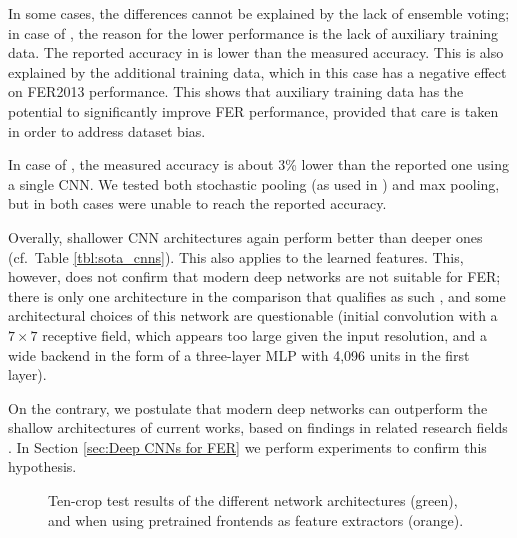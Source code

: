 \documentclass[conference,10pt,a4paper]{IEEEtran}
\begin{document}
In some cases, the differences cannot be explained by the lack of ensemble voting; in case of \cite{zhang2015}, the reason for the lower performance is the lack of auxiliary training data. The reported accuracy in \cite{mollahosseini15} is lower than the measured accuracy. This is also explained by the additional training data, which in this case has a negative effect on FER2013 performance. This shows that auxiliary training data has the potential to significantly improve FER performance, provided that care is taken in order to address dataset bias.

In case of \cite{yu15}, the measured accuracy is about 3\% lower than the reported one using a single CNN. We tested both stochastic pooling (as used in \cite{yu15}) and max pooling, but in both cases were unable to reach the reported accuracy.

Overally, shallower CNN architectures again perform better than deeper ones (cf.\ Table \ref{tbl:sota_cnns}). This also applies to the learned features. This, however, does not confirm that modern deep networks are not suitable for FER; there is only one architecture in the comparison that qualifies as such \cite{mollahosseini15}, and some architectural choices of this network are questionable (initial convolution with a $7\times7$ receptive field, which appears too large given the input resolution, and a wide backend in the form of a three-layer MLP with 4,096 units in the first layer).

On the contrary, we postulate that modern deep networks can outperform the shallow architectures of current works, based on findings in related research fields \cite{schroff15,he15}. In Section \ref{sec:Deep CNNs for FER} we perform experiments to confirm this hypothesis.

\begin{figure}[t]
\begin{center}
\end{center}
\caption{Ten-crop test results of the different network architectures (green), and when using pretrained frontends as feature extractors (orange).}
\label{fig:related-perf}
\end{figure}
\end{document}
